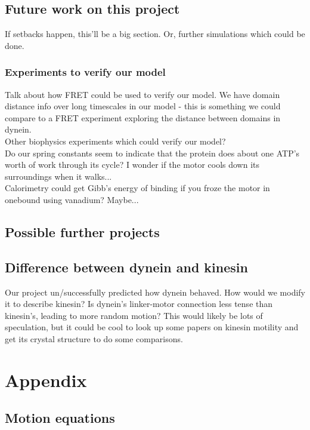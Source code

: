 \documentclass[10pt]{article} %
\begin{document}
\subsection{Future work on this project}
If setbacks happen, this'll be a big section. Or, further simulations which could be done.

\subsubsection{Experiments to verify our model}
Talk about how FRET could be used to verify our model. We have domain distance info over long
timescales in our model - this is something we could compare to a FRET experiment exploring
the distance between domains in dynein.\\

Other biophysics experiments which could verify our model?\\

Do our spring constants seem to indicate that the protein does about one ATP's worth of work through its cycle? I wonder if the motor cools down its surroundings when it walks...\\

Calorimetry could get Gibb's energy of binding if you froze the motor in onebound using
vanadium? Maybe...\\
\subsection{Possible further projects}
\subsection{Difference between dynein and kinesin}
Our project un/successfully predicted how dynein behaved. How would we modify it to describe kinesin?
Is dynein's linker-motor connection less tense than kinesin's, leading to more random motion? This
would likely be lots of speculation, but it could be cool to look up some papers on kinesin motility
and get its crystal structure to do some comparisons.




\section{Appendix}

\subsection{Motion equations}
\end{document}
